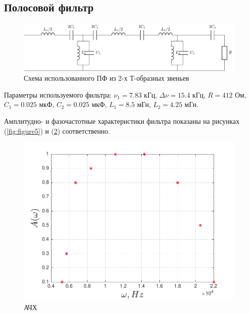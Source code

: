 \subsection{Полосовой фильтр}
\begin{figure}[H]
	\centering
	\includegraphics[scale=1]{chem/chem4}
	\caption{ Схема использованного ПФ из 2-х Т-образных звеньев}
	\label{fig:chem4}
\end{figure}
Параметры используемого фильтра: $\nu_1=7.83$ кГц, $\Delta\nu=15.4$ кГц, $R=412$ Ом, $C_1=0.025$ мкФ,
$C_2=0.025$ мкФ, $L_1=8.5$ мГн, $L_2=4.25$ мГн. 

Амплитудно- и фазочастотные характеристики фильтра показаны на рисунках (\ref{fig:figure5}) и (\ref{fig:figure6}) соответственно.

\begin{figure}[H]
	\centering
	\includegraphics[scale=0.9]{graph/graph5}
	\caption{АЧХ}
	\label{fig:figure6}
\end{figure}

